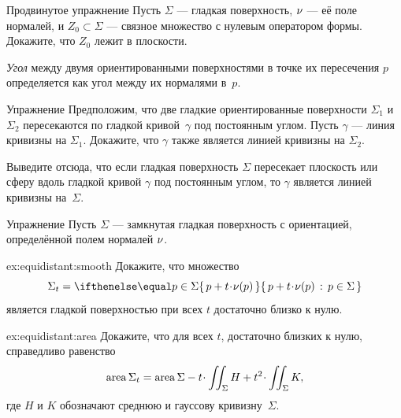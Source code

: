 {\sloppy

\begin{thm}{Продвинутое упражнение}\label{ex:normal-curvature=0}
Пусть $\Sigma$ --- гладкая поверхность, $\nu$ --- её поле нормалей, и $Z_0\subset \Sigma$ --- связное множество с нулевым оператором формы. 
Докажите, что $Z_0$ лежит в плоскости.
\end{thm}

}

{}\emph{Угол} между двумя ориентированными поверхностями в точке их пересечения $p$ определяется как угол между их нормалями в~$p$.

\begin{thm}{Упражнение}\label{ex:shape-curvature-line}
Предположим, что две гладкие ориентированные поверхности $\Sigma_1$ и $\Sigma_2$ пересекаются по гладкой кривой~$\gamma$ под постоянным углом.
Пусть $\gamma$ --- линия кривизны на $\Sigma_1$.
Докажите, что $\gamma$ также является линией кривизны на $\Sigma_2$.

Выведите отсюда, что если гладкая поверхность $\Sigma$ пересекает плоскость или сферу вдоль гладкой кривой $\gamma$ под постоянным углом, то $\gamma$ является линией кривизны на~$\Sigma$.
\end{thm}

\begin{thm}{Упражнение}\label{ex:equidistant}
Пусть $\Sigma$ --- замкнутая гладкая поверхность с ориентацией, определённой полем нормалей $\nu$.

\begin{subthm}{ex:equidistant:smooth}
Докажите, что множество 
\[\Sigma_t=\set{p+t\cdot \Norm(p)}{p\in\Sigma}\] 
является гладкой поверхностью при всех $t$ достаточно близко к нулю.
\end{subthm}

\begin{subthm}{ex:equidistant:area}
Докажите, что для всех $t$, достаточно близких к нулю, справедливо равенство
\[\area\Sigma_t=\area\Sigma-t\cdot \iint_\Sigma H+t^2\cdot \iint_\Sigma K,\]
где $H$ и $K$ обозначают среднюю и гауссову кривизну~$\Sigma$.
\end{subthm}

\end{thm}



